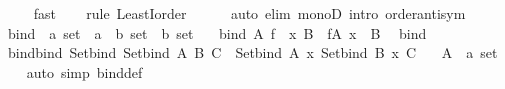 \begin{isabellebody}
\ \ \ \isamarkupfalse%
\ fast\isanewline
\ \ \isamarkupfalse%
\ {\isacharparenleft}{\kern0pt}rule\ LeastI{}{\isacharunderscore}{\kern0pt}order{\isacharparenright}{\kern0pt}\isanewline
\ \ \ \ \isamarkupfalse%
\ {\isacharparenleft}{\kern0pt}auto\ elim{\isacharcolon}{\kern0pt}\ monoD\ intro{\isacharbang}{\kern0pt}{\isacharcolon}{\kern0pt}\ order{\isacharunderscore}{\kern0pt}antisym{\isacharparenright}{\kern0pt}\isanewline
\ \ \isamarkupfalse%
%
\endisatagproof
{\isafoldproof}%
%
\isadelimproof
%
\endisadelimproof
%
\isadelimdocument
%
\endisadelimdocument
%
\isatagdocument
%
\isamarkuptrue%
%
\endisatagdocument
{\isafolddocument}%
%
\isadelimdocument
%
\endisadelimdocument
{}\isamarkupfalse%
\ bind\ {\isacharcolon}{\kern0pt}{\isacharcolon}{\kern0pt}\ {\isachardoublequoteopen}{\isacharprime}{\kern0pt}a\ set\ {\isasymRightarrow}\ {\isacharparenleft}{\kern0pt}{\isacharprime}{\kern0pt}a\ {\isasymRightarrow}\ {\isacharprime}{\kern0pt}b\ set{\isacharparenright}{\kern0pt}\ {\isasymRightarrow}\ {\isacharprime}{\kern0pt}b\ set{\isachardoublequoteclose}\isanewline
\ \ \ {\isachardoublequoteopen}bind\ A\ f\ {\isacharequal}{\kern0pt}\ {\isacharbraceleft}{\kern0pt}x{\isachardot}{\kern0pt}\ {\isasymexists}B\ {\isasymin}\ f{\isacharbackquote}{\kern0pt}A{\isachardot}{\kern0pt}\ x\ {\isasymin}\ B{\isacharbraceright}{\kern0pt}{\isachardoublequoteclose}\isanewline
\isanewline
{}\isamarkupfalse%
\ {\isacharparenleft}{\kern0pt}\ bind\isanewline
\isanewline
{}\isamarkupfalse%
\ bind{\isacharunderscore}{\kern0pt}bind{\isacharcolon}{\kern0pt}\ {\isachardoublequoteopen}Set{\isachardot}{\kern0pt}bind\ {\isacharparenleft}{\kern0pt}Set{\isachardot}{\kern0pt}bind\ A\ B{\isacharparenright}{\kern0pt}\ C\ {\isacharequal}{\kern0pt}\ Set{\isachardot}{\kern0pt}bind\ A\ {\isacharparenleft}{\kern0pt}{\isasymlambda}x{\isachardot}{\kern0pt}\ Set{\isachardot}{\kern0pt}bind\ {\isacharparenleft}{\kern0pt}B\ x{\isacharparenright}{\kern0pt}\ C{\isacharparenright}{\kern0pt}{\isachardoublequoteclose}\isanewline
\ \ \ A\ {\isacharcolon}{\kern0pt}{\isacharcolon}{\kern0pt}\ {\isachardoublequoteopen}{\isacharprime}{\kern0pt}a\ set{\isachardoublequoteclose}\isanewline
%
\isadelimproof
\ \ %
\endisadelimproof
%
\isatagproof
{}\isamarkupfalse%
\ {\isacharparenleft}{\kern0pt}auto\ simp{\isacharcolon}{\kern0pt}\ bind{\isacharunderscore}{\kern0pt}def{\isacharparenright}{\kern0pt}%

\end{isabellebody}
